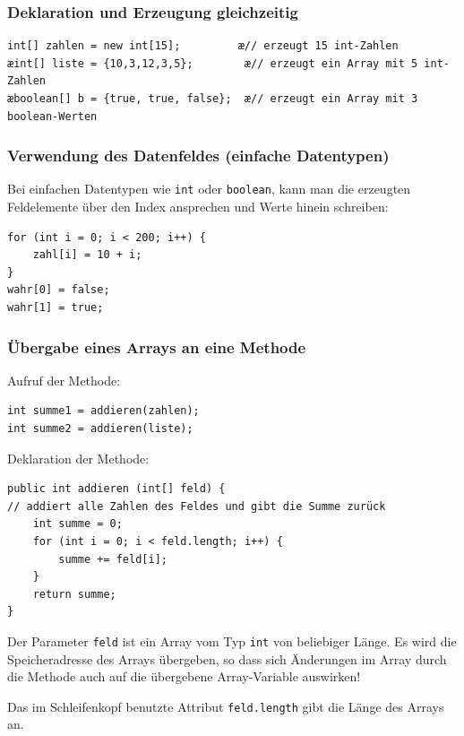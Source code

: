 \subsubsection{Deklaration und Erzeugung gleichzeitig}

\begin{lstlisting}
int[] zahlen = new int[15];         æ// erzeugt 15 int-Zahlen
æint[] liste = {10,3,12,3,5};        æ// erzeugt ein Array mit 5 int-Zahlen
æboolean[] b = {true, true, false};  æ// erzeugt ein Array mit 3 boolean-Werten
\end{lstlisting}

\subsubsection{Verwendung des Datenfeldes (einfache Datentypen)}

Bei einfachen Datentypen wie \lstinline|int| oder \lstinline|boolean|,
kann man die erzeugten Feldelemente über den Index ansprechen und Werte
hinein schreiben:

\begin{lstlisting}
for (int i = 0; i < 200; i++) {
    zahl[i] = 10 + i;
}
wahr[0] = false;
wahr[1] = true;
\end{lstlisting}

\subsubsection{Übergabe eines Arrays an eine Methode}

Aufruf der Methode:

\begin{lstlisting}
int summe1 = addieren(zahlen);
int summe2 = addieren(liste);
\end{lstlisting}

Deklaration der Methode:

\begin{lstlisting}
public int addieren (int[] feld) {
// addiert alle Zahlen des Feldes und gibt die Summe zurück
    int summe = 0;
    for (int i = 0; i < feld.length; i++) {
        summe += feld[i];
    }
    return summe;
}
\end{lstlisting}

Der Parameter \lstinline|feld| ist ein Array vom Typ \lstinline|int| von
beliebiger Länge. Es wird die Speicheradresse des Arrays übergeben, so dass sich
Änderungen im Array durch die Methode auch auf die übergebene Array-Variable
auswirken!

Das im Schleifenkopf benutzte Attribut \lstinline|feld.length| gibt die Länge
des Arrays an.


